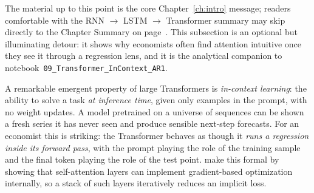 \documentclass[11pt,a4paper]{report}
\begin{document}
The material up to this point is the core Chapter~\ref{ch:intro} message; readers comfortable with the RNN $\to$ LSTM $\to$ Transformer summary may skip directly to the Chapter Summary on page~\pageref{sec:ch1_summary}.  This subsection is an optional but illuminating detour: it shows why economists often find attention intuitive once they see it through a regression lens, and it is the analytical companion to notebook~\texttt{09\_Transformer\_InContext\_AR1}.

A remarkable emergent property of large Transformers is \emph{in-context learning}: the ability to solve a task \emph{at inference time}, given only examples in the prompt, with no weight updates.  A model pretrained on a universe of sequences can be shown a fresh series it has never seen and produce sensible next-step forecasts.  For an economist this is striking: the Transformer behaves as though it \emph{runs a regression inside its forward pass}, with the prompt playing the role of the training sample and the final token playing the role of the test point.  \citet{vonoswald2023transformers} make this formal by showing that self-attention layers can implement gradient-based optimization internally, so a stack of such layers iteratively reduces an implicit loss.
\end{document}
